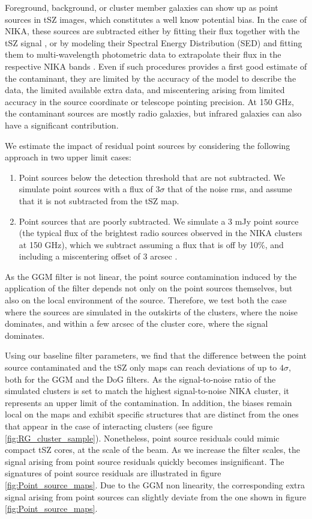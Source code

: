 \documentclass[twocolumn,traditabstract]{aa}
\begin{document}
Foreground, background, or cluster member galaxies can show up as point sources in tSZ images, which constitutes a well know potential bias. In the case of NIKA, these sources are subtracted either by fitting their flux together with the tSZ signal \citep{Adam2015}, or by modeling their Spectral Energy Distribution (SED) and fitting them to multi-wavelength photometric data to extrapolate their flux in the respective NIKA bands \citep[see the method detailed in][]{Adam2016a}. Even if such procedures provides a first good estimate of the contaminant, they are limited by the accuracy of the model to describe the data, the limited available extra data, and miscentering arising from limited accuracy in the source coordinate or telescope pointing precision. At 150 GHz, the contaminant sources are mostly radio galaxies, but infrared galaxies can also have a significant contribution.

We estimate the impact of residual point sources by considering the following approach in two upper limit cases:
\begin{enumerate} 
\item Point sources below the detection threshold that are not subtracted. We simulate point sources with a flux of $3 \sigma$ that of the noise rms, and assume that it is not subtracted from the tSZ map. 
\item Point sources that are poorly subtracted. We simulate a 3 mJy point source (the typical flux of the brightest radio sources observed in the NIKA clusters at 150 GHz), which we subtract assuming a flux that is off by 10\%, and including a miscentering offset of 3 arcsec \citep[the NIKA pointing accuracy for one scan][]{Catalano2014}.
\end{enumerate}
As the GGM filter is not linear, the point source contamination induced by the application of the filter depends not only on the point sources themselves, but also on the local environment of the source. Therefore, we test both the case where the sources are simulated in the outskirts of the clusters, where the noise dominates, and within a few arcsec of the cluster core, where the signal dominates.

Using our baseline filter parameters, we find that the difference between the point source contaminated and the tSZ only maps can reach deviations of up to $4 \sigma$, both for the GGM and the DoG filters. As the signal-to-noise ratio of the simulated clusters is set to match the highest signal-to-noise NIKA cluster, it represents an upper limit of the contamination. In addition, the biases remain local on the maps and exhibit specific structures that are distinct from the ones that appear in the case of interacting clusters (see figure \ref{fig:RG_cluster_sample}). Nonetheless, point source residuals could mimic compact tSZ cores, at the scale of the beam. As we increase the filter scales, the signal arising from point source residuals quickly becomes insignificant. The signatures of point source residuals are illustrated in figure \ref{fig:Point_source_maps}. Due to the GGM non linearity, the corresponding extra signal arising from point sources can slightly deviate from the one shown in figure \ref{fig:Point_source_maps}.
\end{document}
